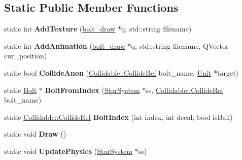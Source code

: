 \subsection*{Static Public Member Functions}
\begin{DoxyCompactItemize}
\item 
static int {\bfseries Add\+Texture} (\hyperlink{classbolt__draw}{bolt\+\_\+draw} $\ast$q, std\+::string filename)\hypertarget{classBolt_a9989b71c21699d8057d09f675763c5ab}{}\label{classBolt_a9989b71c21699d8057d09f675763c5ab}

\item 
static int {\bfseries Add\+Animation} (\hyperlink{classbolt__draw}{bolt\+\_\+draw} $\ast$q, std\+::string filename, Q\+Vector cur\+\_\+position)\hypertarget{classBolt_a3eb7da35648398efa275ed74e5b05f32}{}\label{classBolt_a3eb7da35648398efa275ed74e5b05f32}

\item 
static bool {\bfseries Collide\+Anon} (\hyperlink{unionCollidable_1_1CollideRef}{Collidable\+::\+Collide\+Ref} bolt\+\_\+name, \hyperlink{classUnit}{Unit} $\ast$target)\hypertarget{classBolt_ae893020d24dc20c0dbc632d790f7555e}{}\label{classBolt_ae893020d24dc20c0dbc632d790f7555e}

\item 
static \hyperlink{classBolt}{Bolt} $\ast$ {\bfseries Bolt\+From\+Index} (\hyperlink{classStarSystem}{Star\+System} $\ast$ss, \hyperlink{unionCollidable_1_1CollideRef}{Collidable\+::\+Collide\+Ref} bolt\+\_\+name)\hypertarget{classBolt_a746e41a09b517a45bafb810eab56880c}{}\label{classBolt_a746e41a09b517a45bafb810eab56880c}

\item 
static \hyperlink{unionCollidable_1_1CollideRef}{Collidable\+::\+Collide\+Ref} {\bfseries Bolt\+Index} (int index, int decal, bool is\+Ball)\hypertarget{classBolt_acbf9de87ef4342a032dfe1149cbf8f8f}{}\label{classBolt_acbf9de87ef4342a032dfe1149cbf8f8f}

\item 
static void {\bfseries Draw} ()\hypertarget{classBolt_ae0d0a972930d96aca0dab1c1f5e89953}{}\label{classBolt_ae0d0a972930d96aca0dab1c1f5e89953}

\item 
static void {\bfseries Update\+Physics} (\hyperlink{classStarSystem}{Star\+System} $\ast$ss)\hypertarget{classBolt_a03aa4759ec2aea4c7c72511e2ebd5fc1}{}\label{classBolt_a03aa4759ec2aea4c7c72511e2ebd5fc1}

\end{DoxyCompactItemize}
